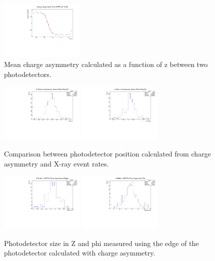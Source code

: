 \begin{figure}
\centering
\includegraphics[width=4cm]{graphics/asym6465.pdf}
\caption{Mean charge asymmetry calculated as a function of z between 
two photodetectors.}
\label{fig:asymplot} 
\end{figure}

\begin{figure}
\centering
\includegraphics[width=4cm]{asymmetryplots/asymzoffset.pdf}
\includegraphics[width=4cm]{asymmetryplots/asymphioffset.pdf}
\caption{Comparison between photodetector position calculated from
charge asymmetry and X-ray event rates.}
\label{fig:asymvsfit} 
\end{figure}



\begin{figure}
\centering
\includegraphics[width=4cm]{asymmetryplots/asymzwid.pdf}
\includegraphics[width=4cm]{asymmetryplots/asymphiwid.pdf}
\caption{Photodetector size in Z and phi measured using the edge of the
photodetector calculated with charge asymmetry.}
\label{fig:mppcsize} 
\end{figure}



